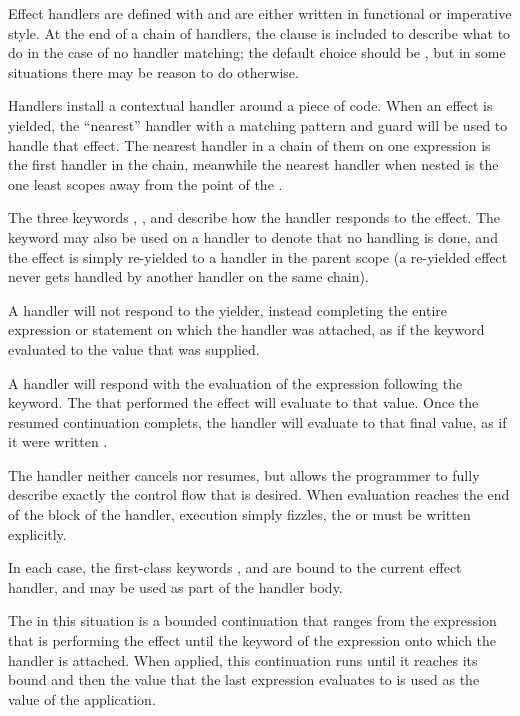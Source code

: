 Effect handlers are defined with  and are either written in functional
or imperative style. At the end of a chain of handlers, the  clause is
included to describe what to do in the case of no handler matching; the default
choice should be , but in some situations there may be reason to
do otherwise.

Handlers install a contextual handler around a piece of code. When an effect is
yielded, the ``nearest'' handler with a matching pattern and guard will be used
to handle that effect. The nearest handler in a chain of them on one expression
is the first handler in the chain, meanwhile the nearest handler when nested is
the one least scopes away from the point of the .

The three keywords , , and  describe how the
handler responds to the effect. The  keyword may also be used on a
handler to denote that no handling is done, and the effect is simply re-yielded
to a handler in the parent scope (a re-yielded effect never gets handled by another
handler on the same chain).

A  handler will not respond to the yielder, instead completing the entire expression
or statement on which the handler was attached, as if the  keyword evaluated
to the value that  was supplied.

A  handler will respond with the evaluation of the expression following
the keyword. The  that performed the effect will evaluate to that value.
Once the resumed continuation complets, the  handler will evaluate to
that final value, as if it were written .

The  handler neither cancels nor resumes, but allows the programmer to fully
describe exactly the control flow that is desired. When evaluation reaches the end of
the block of the  handler, execution simply fizzles, the 
or  must be written explicitly.

In each case, the first-class keywords ,  and  are
bound to the current effect handler, and may be used as part of the handler body.

The  in this situation is a bounded continuation that ranges from the
 expression that is performing the effect until the  keyword
of the expression onto which the handler is attached. When applied, this continuation
runs until it reaches its bound and then the value that the last expression evaluates
to is used as the value of the  application.

